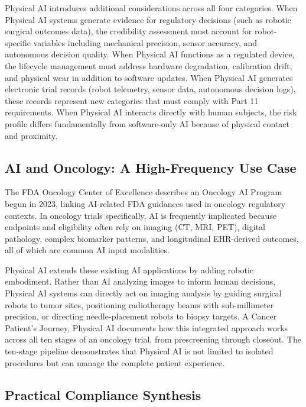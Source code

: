 Physical AI introduces additional considerations across all four categories.
When Physical AI systems generate evidence for regulatory decisions (such as
robotic surgical outcomes data), the credibility assessment must account for
robot-specific variables including mechanical precision, sensor accuracy, and
autonomous decision quality. When Physical AI functions as a regulated device,
the lifecycle management must address hardware degradation, calibration drift,
and physical wear in addition to software updates. When Physical AI generates
electronic trial records (robot telemetry, sensor data, autonomous decision
logs), these records represent new categories that must comply with Part 11
requirements. When Physical AI interacts directly with human subjects, the risk
profile differs fundamentally from software-only AI because of physical contact
and proximity.

\subsection{AI and Oncology: A High-Frequency Use Case}
\label{subsec:ai-oncology}

The FDA Oncology Center of Excellence \cite{fda-oncology-guidance} describes an
Oncology AI Program begun in 2023, linking AI-related FDA guidances used in
oncology regulatory contexts. In oncology trials specifically, AI is frequently
implicated because endpoints and eligibility often rely on imaging (CT, MRI,
PET), digital pathology, complex biomarker patterns, and longitudinal
EHR-derived outcomes, all of which are common AI input modalities.

Physical AI extends these existing AI applications by adding robotic
embodiment. Rather than AI analyzing images to inform human decisions, Physical
AI systems can directly act on imaging analysis by guiding surgical robots to
tumor sites, positioning radiotherapy beams with sub-millimeter precision, or
directing needle-placement robots to biopsy targets. A Cancer Patient's
Journey, Physical AI \cite{patient-journey-paper} documents how this integrated
approach works across all ten stages of an oncology trial, from prescreening
through closeout. The ten-stage pipeline demonstrates that Physical AI is not
limited to isolated procedures but can manage the complete patient experience.

\subsection{Practical Compliance Synthesis}
\label{subsec:compliance-synthesis}

